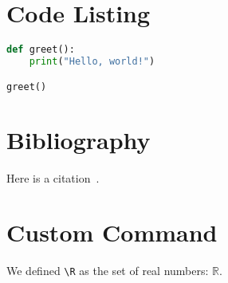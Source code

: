 \documentclass[12pt,a4paper]{article}
\newcommand{\R}{\mathbb{R}}
\begin{document}
\section{Code Listing}
\begin{lstlisting}[language=Python, caption=Python Example]
def greet():
    print("Hello, world!")

greet()
\end{lstlisting}

\section{Bibliography}
Here is a citation~\cite{lamport1994latex}. \\
\printbibliography

\section{Custom Command}
We defined \verb|\R| as the set of real numbers: $\R$.
\end{document}
